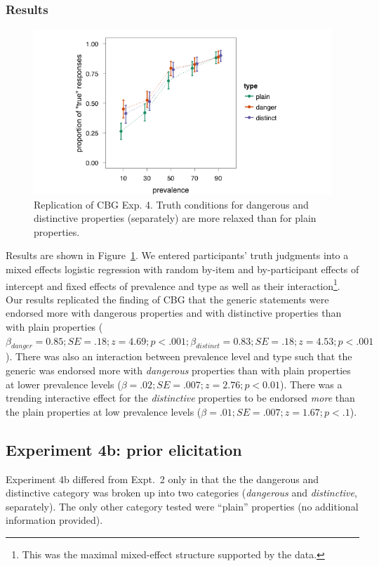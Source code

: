 \documentclass[10pt,letterpaper]{article}
\begin{document}
\subsubsection{Results}

\begin{figure}
\centering
    \includegraphics[width=0.8\columnwidth]{dd_separate_truthconds}
    \caption{Replication of CBG Exp. 4. Truth conditions for dangerous and distinctive properties (separately) are more relaxed than for plain properties.}
  \label{fig:ddseparate}
\end{figure}

Results are shown in Figure~\ref{fig:ddseparate}. We entered participants' truth judgments into a mixed effects logistic regression with random by-item and by-participant effects of intercept and fixed effects of prevalence and type as well as their interaction\footnote{This was the maximal mixed-effect structure supported by the data.}.  
%
Our results replicated the finding of CBG that the generic statements were endorsed more with dangerous properties and with distinctive properties than with plain properties ($\beta_{danger}=0.85; SE = .18; z = 4.69; p < .001; \beta_{distinct}=0.83; SE = .18; z = 4.53; p < .001$). 
%
There was also an interaction between prevalence level and type such that the generic was endorsed more with \emph{dangerous} properties than with plain properties at lower prevalence levels ($\beta=.02; SE = .007; z=2.76; p < 0.01$). There was a trending interactive effect for the \emph{distinctive} properties to be endorsed \emph{more} than the plain properties at low prevalence levels ($\beta=.01; SE = .007; z=1.67; p < .1$).


\subsection{Experiment 4b: prior elicitation}

Experiment 4b differed from Expt.~2 only in that the the dangerous and distinctive category was broken up into two categories (\emph{dangerous} and \emph{distinctive}, separately). The only other category tested were ``plain'' properties (no additional information provided).
\end{document}
